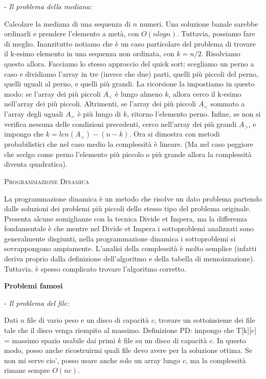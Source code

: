 \documentclass[a4paper,10pt]{article} %
\newcommand{\msection}[1]{%
    {\newpage\bigbreak \bigbreak \par \hfil \huge \textsc {#1}}\par}
\renewcommand{\b}[1]{%
    {\textbf{#1}}}
\begin{document}
- \emph{Il problema della mediana:} \par
Calcolare la mediana di una sequenza di $n$ numeri. Una soluzione banale sarebbe ordinarli e prendere l'elemento a metà, con $O(nlogn)$. Tuttavia, possiamo fare di meglio. Inanzitutto notiamo che è un caso particolare del problema di trovare il k-esimo elemento in una sequenza non ordinata, con $k = n/2$. Risolviamo questo allora. Facciamo lo stesso approccio del quick sort: scegliamo un perno a caso e dividiamo l'array in tre (invece che due) parti, quelli più piccoli del perno, quelli uguali al perno, e quelli più grandi. La ricorsione la impostiamo in questo modo: se l'array dei più piccoli $A_<$ è lungo almeno $k$, allora cerco il k-esimo nell'array dei più piccoli. Altrimenti, se l'array dei più piccoli $A_<$ sommato a l'array degli uguali $A_=$ è più lungo di $k$, ritorno l'elemento perno. Infine, se non si verifica nessuna delle condizioni precedenti, cerco nell'array dei più grandi $A_>$, e impongo che $k = len(A_>) - (n - k)$. Ora si dimostra con metodi probabilistici che nel caso medio la complessità è lineare. (Ma nel caso peggiore che scelgo come perno l'elemento più piccolo o più grande allora la complessità diventa quadratica).



\msection{Programmazione Dinamica}



La programmazione dinamica è un metodo che risolve un dato problema partendo dalle soluzioni dei problemi più piccoli dello stesso tipo del problema originale. Presenta alcune somiglianze con la tecnica Divide et Impera, ma la differenza fondamentale è che mentre nel Divide et Impera i sottoproblemi analizzati sono generalmente disgiunti, nella programmazione dinamica i sottoproblemi si sovrappongono ampiamente. L'analisi della complessità è molto semplice (infatti deriva proprio dalla definizione dell'algoritmo e della tabella di memoizzazione). Tuttavia, è spesso complicato trovare l'algoritmo corretto. 

\medskip
\centerline{\b{Problemi famosi}}
\medskip

- \emph{Il problema del file:} \par
Dati $n$ file di vario peso e un disco di capacità $c$, trovare un sottoinsieme dei file tale che il disco venga riempito al massimo. Definizione PD: impongo che T[k][c] = massimo spazio usabile dai primi $k$ file su un disco di capacità $c$. In questo modo, posso anche ricostruirmi quali file devo avere per la soluzione ottima. Se non mi serve cio', posso usare anche solo un array lungo $c$, ma la complessità rimane sempre $O(nc)$.
\medskip
\end{document}
